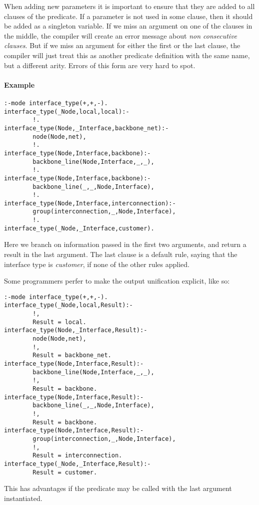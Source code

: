 \documentclass[a4paper,12pt]{report}
\begin{document}
When adding new parameters it is important to ensure that they are added to all 
clauses of the predicate. If a parameter is not used in some clause, then it 
should be added as a singleton variable.
If we miss an argument on one of the clauses in the middle, the compiler will create an error message about {\it non consecutive clauses}. But if we miss an argument for either the first or the last clause, the compiler will just treat this as another predicate definition with the same name, but a different arity. Errors of this form are very hard to spot.
\paragraph{Example}
\begin{verbatim}
:-mode interface_type(+,+,-).
interface_type(_Node,local,local):-
        !.
interface_type(Node,_Interface,backbone_net):-
        node(Node,net),
        !.
interface_type(Node,Interface,backbone):-
        backbone_line(Node,Interface,_,_),
        !.
interface_type(Node,Interface,backbone):-
        backbone_line(_,_,Node,Interface),
        !.
interface_type(Node,Interface,interconnection):-
        group(interconnection,_,Node,Interface),
        !.
interface_type(_Node,_Interface,customer).
\end{verbatim}
Here we branch on information passed in the first two arguments, and return a result in the last argument. The last clause is a default rule, saying that the interface type is {\it customer}, if none of the other rules applied.

Some programmers perfer to make the output unification explicit, like so:
\begin{verbatim}
:-mode interface_type(+,+,-).
interface_type(_Node,local,Result):-
        !,
        Result = local.
interface_type(Node,_Interface,Result):-
        node(Node,net),
        !,
        Result = backbone_net.
interface_type(Node,Interface,Result):-
        backbone_line(Node,Interface,_,_),
        !,
        Result = backbone.
interface_type(Node,Interface,Result):-
        backbone_line(_,_,Node,Interface),
        !,
        Result = backbone.
interface_type(Node,Interface,Result):-
        group(interconnection,_,Node,Interface),
        !,
        Result = interconnection.
interface_type(_Node,_Interface,Result):-
        Result = customer.
\end{verbatim}
This has advantages if the predicate may be called with the last argument instantiated.
\pagebreak
\end{document}
